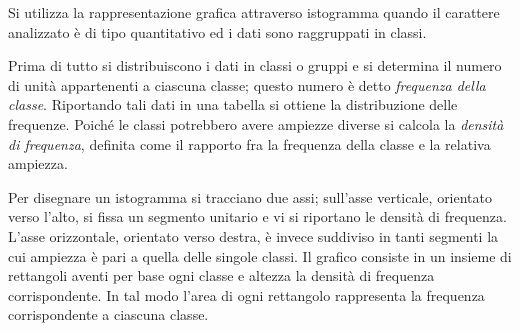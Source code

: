 Si utilizza la rappresentazione grafica attraverso istogramma quando il carattere analizzato è di tipo quantitativo ed i dati sono raggruppati in classi.

Prima di tutto si distribuiscono i dati in classi o gruppi e si determina il numero di unità appartenenti a ciascuna classe; questo numero è
detto \emph{frequenza della classe}.
Riportando tali dati in una tabella si ottiene la distribuzione delle frequenze. Poiché le classi potrebbero avere ampiezze diverse si calcola
la \emph{densità di frequenza}, definita come il rapporto fra la frequenza della classe e la relativa ampiezza.

Per disegnare un istogramma si tracciano due assi; sull'asse verticale, orientato verso l'alto, si fissa un segmento unitario e vi si riportano
le densità di frequenza. L'asse orizzontale, orientato verso destra, è invece suddiviso in tanti segmenti la cui ampiezza è pari a quella delle singole classi.
Il grafico consiste in un insieme di rettangoli aventi per base ogni classe e altezza la densità di frequenza corrispondente.
In tal modo l'area di ogni rettangolo rappresenta la frequenza corrispondente a ciascuna classe.

